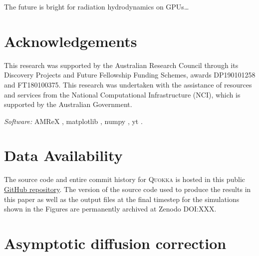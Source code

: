 \documentclass[fleqn,usenatbib]{mnras}
\begin{document}
The future is bright for radiation hydrodynamics on GPUs\dots

\section*{Acknowledgements}

This research was supported by the Australian Research Council through its Discovery Projects and Future Fellowship Funding Schemes, awards DP190101258 and FT180100375. This research was undertaken with the assistance of resources and services from the National Computational Infrastructure (NCI), which is supported by the Australian Government.

\emph{Software:} AMReX \citep{the_amrex_development_team_2021_5363443},
matplotlib \citep{Hunter:2007},
numpy \citep{harris2020array}, yt \citep{Turk11a}.

\section*{Data Availability}
The source code and entire commit history for \textsc{Quokka} is hosted in this public \faGithub\href{https://github.com/BenWibking/quokka-code}{GitHub repository}. The version of the source code used to produce the results in this paper as well as the output files at the final timestep for the simulations shown in the Figures are permanently archived at Zenodo DOI:XXX.






\appendix
\section{Asymptotic diffusion correction}
\label{appendix:asymptotic_correction}



\bsp	%
\label{lastpage}
\end{document}

